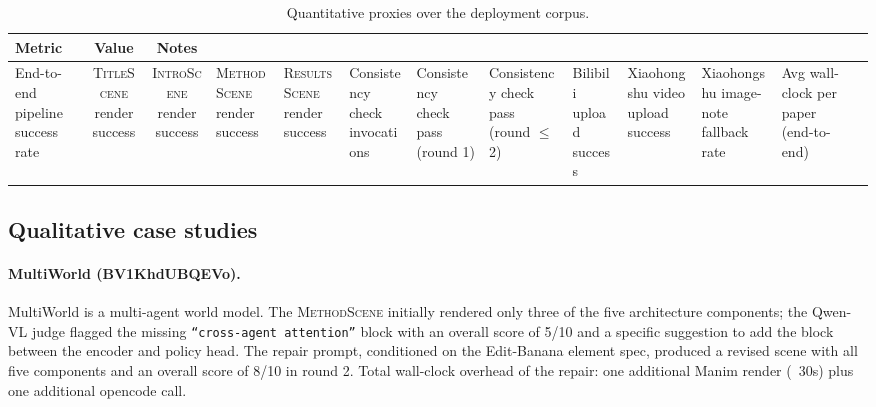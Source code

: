 \documentclass[11pt,a4paper]{article}
\begin{document}
\begin{table}[t]
\centering
\small
\begin{tabular}{@{}lcc@{}}
\toprule
Metric & Value & Notes \\
\midrule
End-to-end pipeline success rate & %
\textsc{TitleScene} render success & %
\textsc{IntroScene} render success & %
\textsc{MethodScene} render success & %
\textsc{ResultsScene} render success & %
Consistency check invocations & %
Consistency check pass (round 1) & %
Consistency check pass (round $\le$2) & %
Bilibili upload success & %
Xiaohongshu video upload success & %
Xiaohongshu image-note fallback rate & %
Avg wall-clock per paper (end-to-end) & %
\bottomrule
\end{tabular}
\caption{Quantitative proxies over the deployment corpus. %
}
\label{tab:quant}
\end{table}

\subsection{Qualitative case studies}

\paragraph{MultiWorld (BV1KhdUBQEVo).}
MultiWorld is a multi-agent world model. The \textsc{MethodScene} initially rendered only three of the five architecture components; the Qwen-VL judge flagged the missing \texttt{``cross-agent attention''} block with an overall score of 5/10 and a specific suggestion to add the block between the encoder and policy head. The repair prompt, conditioned on the Edit-Banana element spec, produced a revised scene with all five components and an overall score of 8/10 in round 2. Total wall-clock overhead of the repair: one additional Manim render (~30s) plus one additional opencode call. %
\end{document}
